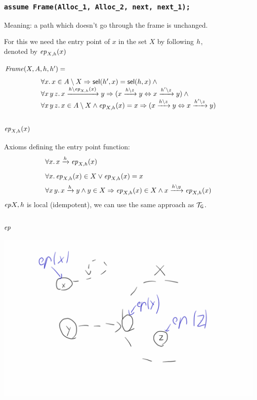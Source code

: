 \documentclass{beamer}
\begin{document}
\begin{frame}
  \frametitle{\texttt{assume Frame(Alloc\_1, Alloc\_2, next, next\_1);}}

Meaning: a path which doesn't go through the frame is unchanged.

\vspace{2ex}

For this we need the entry point of $x$ in the set $X$ by following $\edge$,\\
denoted by $\ep_{X,\edge}(x)$

\vspace{2ex}

$\mkframe(X,A,\edge,\edge') =$
\[
\begin{array}[t]{l}
\forall x. \, x \in A \setminus X \Rightarrow \sel(\edge', x) = \sel(\edge, x) \land {} \\
\forall x\, y \, z. \, \creachf{\edge}{x}{y}{\ep_{X,\edge}(x)} \Rightarrow (\creachf{\edge}{x}{y}{z} \Leftrightarrow \creachf{\edge'}{x}{y}{z}) \land {}\\
\forall x\, y\, z. \, x \in A \setminus X \land \ep_{X,\edge}(x)=x \Rightarrow (\creachf{\edge}{x}{y}{z} \Leftrightarrow \creachf{\edge'}{x}{y}{z})
\end{array}
\]
\end{frame}

\begin{frame}
  \frametitle{$\ep_{X,\edge}(x)$}
  
  Axioms defining the entry point function:
  \begin{align*}
    & \forall x. \, \reachf{\edge}{x}{\ep_{X,\edge}(x)} \\[.5em]
    & \forall x. \, \ep_{X,\edge}(x) \in X \lor \ep_{X,\edge}(x) =     x\\
    & \forall x \, y. \, \reachf{\edge}{x}{y} \land y \in X     \Rightarrow \ep_{X,\edge}(x) \in X \land     \creachf{\edge}{x}{\ep_{X,\edge}(x)}{y}
  \end{align*}
  $\ep{X,\edge}$ is local (idempotent), we can use the same approach as $\graphtheory$.


\end{frame}

\begin{frame}
  \frametitle{$\ep$}
  \includegraphics[scale=0.22]{resources/ep.png}
\end{frame}
\end{document}

